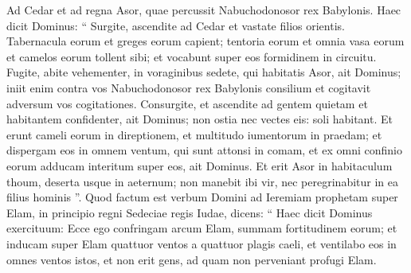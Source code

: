 \begin{biblechapter}
\begin{biblechapter}
\begin{biblechapter}
\begin{biblechapter}
\begin{biblechapter}
\begin{biblechapter}
\begin{biblechapter}
\begin{biblechapter}
\begin{biblechapter}
\begin{biblechapter}
\begin{biblechapter}
\begin{biblechapter}
\begin{biblechapter}
\begin{biblechapter}
\begin{biblechapter}
\begin{biblechapter}
\begin{biblechapter}
\begin{biblechapter}
\begin{biblechapter}
\begin{biblechapter}
\begin{biblechapter}
\begin{biblechapter}
\begin{biblechapter}
\begin{biblechapter}
\begin{biblechapter}
\begin{biblechapter}
\begin{biblechapter}
\begin{biblechapter}
\begin{biblechapter}
\begin{biblechapter}
\begin{biblechapter}
\begin{biblechapter}
\begin{biblechapter}
\begin{biblechapter}
\begin{biblechapter}
\begin{biblechapter}
\begin{biblechapter}
\begin{biblechapter}
\begin{biblechapter}
\begin{biblechapter}
\begin{biblechapter}
\begin{biblechapter}
\begin{biblechapter}
\begin{biblechapter}
\begin{biblechapter}
\begin{biblechapter}
\begin{biblechapter}
\begin{biblechapter}
\begin{biblechapter}
 \verse Ad Cedar et ad regna Asor, quae percussit Nabuchodonosor rex Babylonis.
 Haec dicit Dominus:
 “ Surgite, ascendite ad Cedar
 et vastate filios orientis.
 \verse Tabernacula eorum et greges eorum capient;
 tentoria eorum et omnia vasa eorum
 et camelos eorum tollent sibi;
 et vocabunt super eos formidinem in circuitu.
 \verse Fugite, abite vehementer,
 in voraginibus sedete,
 qui habitatis Asor,
 ait Dominus;
 iniit enim contra vos
 Nabuchodonosor rex Babylonis consilium
 et cogitavit adversum vos cogitationes.
 \verse Consurgite, et ascendite
 ad gentem quietam et habitantem confidenter,
 ait Dominus;
 non ostia nec vectes eis:
 soli habitant.
 \verse Et erunt cameli eorum in direptionem,
 et multitudo iumentorum in praedam;
 et dispergam eos in omnem ventum, qui sunt attonsi in comam,
 et ex omni confinio eorum
 adducam interitum super eos,
 ait Dominus.
 \verse Et erit Asor in habitaculum thoum,
 deserta usque in aeternum;
 non manebit ibi vir,
 nec peregrinabitur in ea filius hominis ”.
 \verse Quod factum est verbum Domini ad Ieremiam prophetam super Elam, in principio regni Sedeciae regis Iudae, dicens:
 \verse “ Haec dicit Dominus exercituum:
 Ecce ego confringam arcum Elam, summam fortitudinem eorum;
 \verse et inducam super Elam
 quattuor ventos a quattuor plagis caeli,
 et ventilabo eos in omnes ventos istos,
 et non erit gens,
 ad quam non perveniant profugi Elam.

\end{biblechapter}
\end{biblechapter}
\end{biblechapter}
\end{biblechapter}
\end{biblechapter}
\end{biblechapter}
\end{biblechapter}
\end{biblechapter}
\end{biblechapter}
\end{biblechapter}
\end{biblechapter}
\end{biblechapter}
\end{biblechapter}
\end{biblechapter}
\end{biblechapter}
\end{biblechapter}
\end{biblechapter}
\end{biblechapter}
\end{biblechapter}
\end{biblechapter}
\end{biblechapter}
\end{biblechapter}
\end{biblechapter}
\end{biblechapter}
\end{biblechapter}
\end{biblechapter}
\end{biblechapter}
\end{biblechapter}
\end{biblechapter}
\end{biblechapter}
\end{biblechapter}
\end{biblechapter}
\end{biblechapter}
\end{biblechapter}
\end{biblechapter}
\end{biblechapter}
\end{biblechapter}
\end{biblechapter}
\end{biblechapter}
\end{biblechapter}
\end{biblechapter}
\end{biblechapter}
\end{biblechapter}
\end{biblechapter}
\end{biblechapter}
\end{biblechapter}
\end{biblechapter}
\end{biblechapter}
\end{biblechapter}
